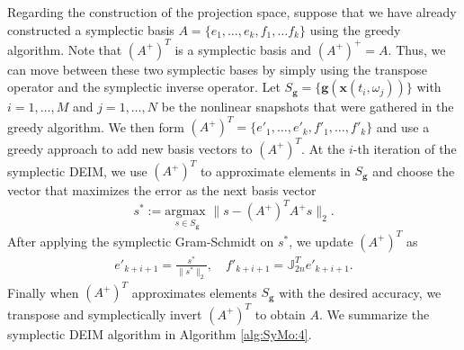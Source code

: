 Regarding the construction of the projection space, suppose that we have already constructed a symplectic basis $A=\{ e_1,\dots , e_k,f_1,\dots f_k \}$ using the greedy algorithm. Note that $(A^+)^T$ is a symplectic basis and $(A^+)^+=A$. Thus, we can move between these two symplectic bases by simply using the transpose operator and the symplectic inverse operator. Let $S_{\mathbf g} = \{ \mathbf g (\mathbf x(t_i,\omega_j)) \}$ with $i = 1,\dots,M$ and $ j = 1 ,\dots,N$ be the nonlinear snapshots that were gathered in the greedy algorithm. We then form $(A^+)^T = \{ e'_1,\dots, e'_k,f'_1,\dots,f'_k\}$ and use a greedy approach to add new basis vectors to $(A^+)^T$. At the $i$-th iteration of the symplectic DEIM, we use $(A^+)^T$ to approximate elements in $S_{\mathbf g}$ and choose the vector that maximizes the error as the next basis vector 
\begin{equation}
	s^* := \underset{s \in S_{\mathbf g}}{\text{argmax }}\| s - (A^+)^T A^+ s \|_2.	
\end{equation}
After applying the symplectic Gram-Schmidt on $s^*$, we update $(A^+)^T$ as
\begin{equation}
\begin{aligned}
	e'_{k+i+1} = \frac{s^*}{\| s^* \|_2},\quad f'_{k+i+1} = \mathbb J_{2n}^T e'_{k+i+1}.
\end{aligned}
\end{equation}
Finally when $(A^+)^T$ approximates elements $S_{\mathbf g}$ with the desired accuracy, we transpose and symplectically invert $(A^+)^T$ to obtain $A$. We summarize the symplectic DEIM algorithm in Algorithm \ref{alg:SyMo:4}.



